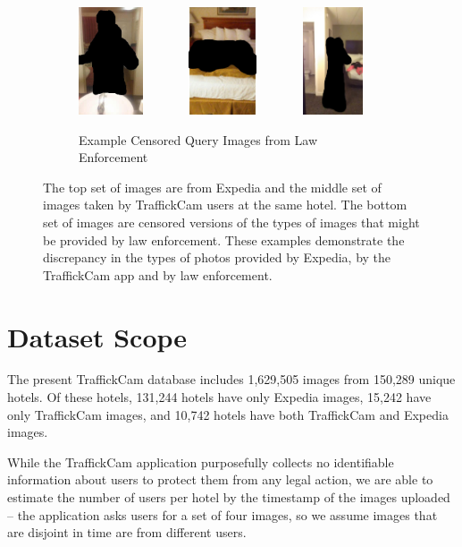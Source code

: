 \begin{figure}[ht!]
\begin{center}
  \begin{subfigure}[b]{\textwidth}
  \centering
    \includegraphics[height=120px]{figures/chapter3/backpage/3.jpg}
    ~~~~~~
    \includegraphics[height=120px]{figures/chapter3/backpage/1.jpg}
    ~~~~~~
    \includegraphics[height=120px]{figures/chapter3/backpage/2.jpg}
    \caption{Example Censored Query Images from Law Enforcement}
  \end{subfigure}
  
  \caption[Example images from TraffickCam and Expedia.]{The top set of images are from Expedia and the middle set of images taken by TraffickCam users at the same hotel. The bottom set of images are censored versions of the types of images that might be provided by law enforcement. These examples demonstrate the discrepancy in the types of photos provided by Expedia, by the TraffickCam app and by law enforcement.}
  \label{fig:example_ims}
  \end{center}
\end{figure}

\section{Dataset Scope}
The present TraffickCam database includes 1,629,505 images from 150,289 unique hotels. Of these hotels, 131,244 hotels have only Expedia images, 15,242 have only TraffickCam images, and 10,742 hotels have both TraffickCam and Expedia images.

While the TraffickCam application purposefully collects no identifiable information about users to protect them from any legal action, we are able to estimate the number of users per hotel by the timestamp of the images uploaded -- the application asks users for a set of four images, so we assume images that are disjoint in time are from different users.

